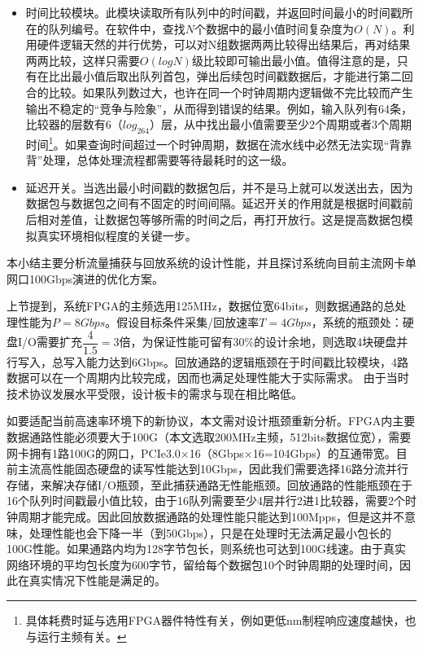 \begin{itemize}
	\item 时间比较模块。此模块读取所有队列中的时间戳，并返回时间最小的时间戳所在的队列编号。在软件中，查找$N$个数据中的最小值时间复杂度为$ O(N) $。利用硬件逻辑天然的并行优势，可以对N组数据两两比较得出结果后，再对结果两两比较，这样只需要$ O(log N) $级比较即可输出最小值。值得注意的是，只有在比出最小值后取出队列首包，弹出后续包时间戳数据后，才能进行第二回合的比较。如果队列数过大，也许在同一个时钟周期内逻辑做不完比较而产生输出不稳定的“竞争与险象”，从而得到错误的结果。例如，输入队列有64条，比较器的层数有6（$ log_264 $）层，从中找出最小值需要至少2个周期或者3个周期时间\footnote{具体耗费时延与选用FPGA器件特性有关，例如更低nm制程响应速度越快，也与运行主频有关。}。如果查询时间超过一个时钟周期，数据在流水线中必然无法实现“背靠背”处理，总体处理流程都需要等待最耗时的这一级。
	\item 延迟开关。当选出最小时间戳的数据包后，并不是马上就可以发送出去，因为数据包与数据包之间有不固定的时间间隔。延迟开关的作用就是根据时间戳前后相对差值，让数据包等够所需的时间之后，再打开放行。这是提高数据包模拟真实环境相似程度的关键一步。
\end{itemize}

\label{chap345}

本小结主要分析流量捕获与回放系统的设计性能，并且探讨系统向目前主流网卡单网口100Gbps演进的优化方案。

上节提到，系统FPGA的主频选用125MHz，数据位宽64bits，则数据通路的总处理性能为$ P=8Gbps $。假设目标条件采集/回放速率$ T=4Gbps $，系统的瓶颈处：硬盘I/O需要扩充$ \dfrac{4}{1.5}=3 $倍，为保证性能可留有30\%的设计余地，则选取4块硬盘并行写入，总写入能力达到6Gbps。回放通路的逻辑瓶颈在于时间戳比较模块，4路数据可以在一个周期内比较完成，因而也满足处理性能大于实际需求。
由于当时技术协议发展水平受限，设计板卡的需求与现在相比略低。

如要适配当前高速率环境下的新协议，本文需对设计瓶颈重新分析。FPGA内主要数据通路性能必须要大于100G（本文选取200MHz主频，512bits数据位宽），需要网卡拥有1路100G的网口，PCIe3.0$ \times $16（8Gbps$\times$16=104Gbps）的互通带宽。目前主流高性能固态硬盘的读写性能达到10Gbps，因此我们需要选择16路分流并行存储，来解决存储I/O瓶颈，至此捕获通路无性能瓶颈。回放通路的性能瓶颈在于16个队列时间戳最小值比较，由于16队列需要至少4层并行2进1比较器，需要2个时钟周期才能完成。因此回放数据通路的处理性能只能达到100Mpps，但是这并不意味，处理性能也会下降一半（到50Gbps），只是在处理时无法满足最小包长的100G性能。如果通路内均为128字节包长，则系统也可达到100G线速。由于真实网络环境的平均包长度为600字节，留给每个数据包10个时钟周期的处理时间，因此在真实情况下性能是满足的。



